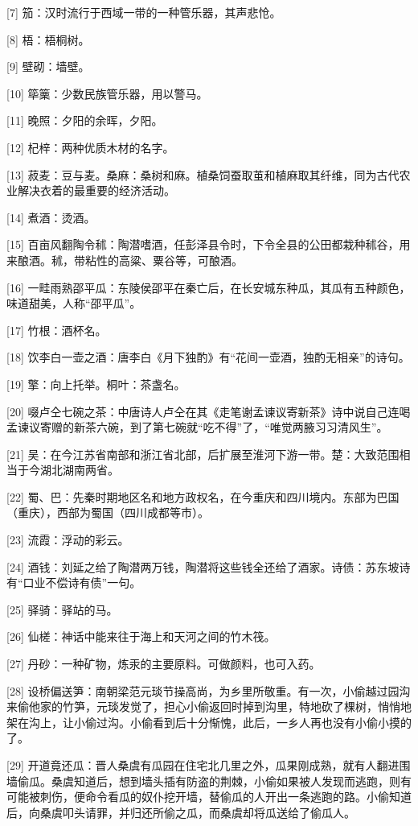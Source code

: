 \documentclass[12pt,UTF8]{ctexbook}
\begin{document}
[7] 笳：汉时流行于西域一带的一种管乐器，其声悲怆。

[8] 梧：梧桐树。

[9] 壁砌：墙壁。

[10] 筚篥：少数民族管乐器，用以警马。

[11] 晚照：夕阳的余晖，夕阳。

[12] 杞梓：两种优质木材的名字。

[13] 菽麦：豆与麦。桑麻：桑树和麻。植桑饲蚕取茧和植麻取其纤维，同为古代农业解决衣着的最重要的经济活动。

[14] 煮酒：烫酒。

[15] 百亩风翻陶令秫：陶潜嗜酒，任彭泽县令时，下令全县的公田都栽种秫谷，用来酿酒。秫，带粘性的高粱、粟谷等，可酿酒。

[16] 一畦雨熟邵平瓜：东陵侯邵平在秦亡后，在长安城东种瓜，其瓜有五种颜色，味道甜美，人称“邵平瓜”。

[17] 竹根：酒杯名。

[18] 饮李白一壶之酒：唐李白《月下独酌》有“花间一壶酒，独酌无相亲”的诗句。

[19] 擎：向上托举。桐叶：茶盏名。

[20] 啜卢仝七碗之茶：中唐诗人卢仝在其《走笔谢孟谏议寄新茶》诗中说自己连喝孟谏议寄赠的新茶六碗，到了第七碗就“吃不得”了，“唯觉两腋习习清风生”。

[21] 吴：在今江苏省南部和浙江省北部，后扩展至淮河下游一带。楚：大致范围相当于今湖北湖南两省。

[22] 蜀、巴：先秦时期地区名和地方政权名，在今重庆和四川境内。东部为巴国（重庆），西部为蜀国（四川成都等市）。

[23] 流霞：浮动的彩云。

[24] 酒钱：刘延之给了陶潜两万钱，陶潜将这些钱全还给了酒家。诗债：苏东坡诗有“口业不偿诗有债”一句。

[25] 驿骑：驿站的马。

[26] 仙槎：神话中能来往于海上和天河之间的竹木筏。

[27] 丹砂：一种矿物，炼汞的主要原料。可做颜料，也可入药。

[28] 设桥偏送笋：南朝梁范元琰节操高尚，为乡里所敬重。有一次，小偷越过园沟来偷他家的竹笋，元琰发觉了，担心小偷返回时掉到沟里，特地砍了棵树，悄悄地架在沟上，让小偷过沟。小偷看到后十分惭愧，此后，一乡人再也没有小偷小摸的了。

[29] 开道竟还瓜：晋人桑虞有瓜园在住宅北几里之外，瓜果刚成熟，就有人翻进围墙偷瓜。桑虞知道后，想到墙头插有防盗的荆棘，小偷如果被人发现而逃跑，则有可能被刺伤，便命令看瓜的奴仆挖开墙，替偷瓜的人开出一条逃跑的路。小偷知道后，向桑虞叩头请罪，并归还所偷之瓜，而桑虞却将瓜送给了偷瓜人。
\end{document}
